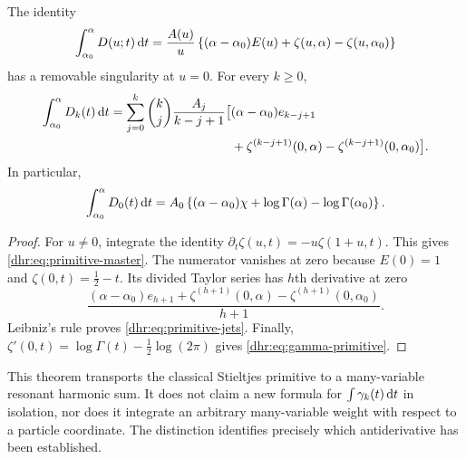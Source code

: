 \begin{theorem}
\label{dhr:thm:primitive}
The identity
\begin{equation}\label{dhr:eq:primitive-master}
 \int_{\alpha_0}^{\alpha}D(u;t)\,\mathrm d t
 =\frac{A(u)}u\left\{(\alpha-\alpha_0)E(u)
                  +\zeta(u,\alpha)-\zeta(u,\alpha_0)\right\}
\end{equation}
has a removable singularity at $u=0$. For every $k\geq0$,
\begin{align}
 \int_{\alpha_0}^{\alpha}D_k(t)\,\mathrm d t
 =\sum_{j=0}^k\binom{k}{j}\frac{A_j}{k-j+1}
 \big[& (\alpha-\alpha_0)e_{k-j+1}\notag\\
 &+\zeta^{(k-j+1)}(0,\alpha)
 -\zeta^{(k-j+1)}(0,\alpha_0)\big].
 \label{dhr:eq:primitive-jets}
\end{align}
In particular,
\begin{equation}\label{dhr:eq:gamma-primitive}
 \int_{\alpha_0}^{\alpha}D_0(t)\,\mathrm d t
 =A_0\left\{(\alpha-\alpha_0)\chi
       +\log\Gamma(\alpha)-\log\Gamma(\alpha_0)\right\}.
\end{equation}
\end{theorem}
\begin{proof}
For $u\ne0$, integrate the identity
$\partial_t\zeta(u,t)=-u\zeta(1+u,t)$.
This gives \eqref{dhr:eq:primitive-master}. The numerator vanishes
at zero because $E(0)=1$ and $\zeta(0,t)=\tfrac12-t$.
Its divided Taylor series has $h$th derivative at zero
\[
 \frac{(\alpha-\alpha_0)e_{h+1}
       +\zeta^{(h+1)}(0,\alpha)-\zeta^{(h+1)}(0,\alpha_0)}{h+1}.
\]
Leibniz's rule proves \eqref{dhr:eq:primitive-jets}. Finally,
$\zeta'(0,t)=\log\Gamma(t)-\tfrac12\log(2\pi)$
\cite{dlmf:hurwitz} gives \eqref{dhr:eq:gamma-primitive}.
\end{proof}

This theorem transports the classical Stieltjes primitive to a
many-variable resonant harmonic sum. It does not claim a new formula
for $\int\gamma_k(t)\,\mathrm d t$ in isolation, nor does it integrate an
arbitrary many-variable weight with respect to a particle coordinate.
The distinction identifies precisely which antiderivative has been
established.
